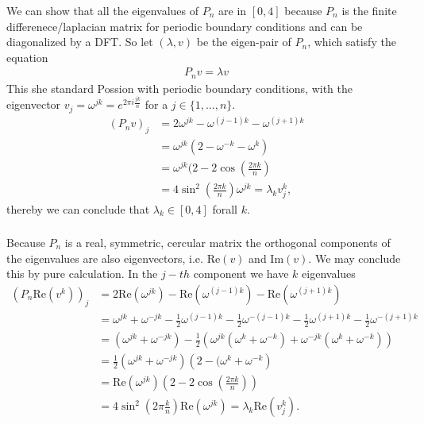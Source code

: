\subsubsection{}
We can show that all the eigenvalues of $P_n$ are in $[0, 4]$ because $P_n$
is the finite differenece/laplacian matrix for periodic boundary conditions
and can be diagonalized by a DFT. So let $\left( \lambda, v \right)$ be the
eigen-pair of $P_n$, which satisfy the equation
\begin{align}
    P_n v = \lambda v
\end{align}
This she standard Possion with periodic boundary conditions, with the
eigenvector $v_j = \omega^{jk} = e^{2\pi i \frac{jk}{n}}$ for a $j \in
\{1,\ldots,n\}$.
\begin{align}
    (P_n v)_j
    &= 2\omega^{jk}- \omega^{(j-1)k} - \omega^{(j+1)k}\\
    &= \omega^{jk}(2 - \omega^{-k} - \omega^{k})\\
    &= \omega^{jk}(2 - 2\cos\left( \frac{2\pi k}{n} \right)\\
    &= 4\sin^2\left( \frac{2\pi k}{n} \right) \omega^{jk} = \lambda_k v^k_j,
\end{align}
thereby we can conclude that $\lambda_k \in [0, 4]$ forall $k$.
\subsubsection{}
Because $P_n$ is a real, symmetric, cercular matrix the orthogonal components
of the eigenvalues are also eigenvectors, i.e. $\text{Re}\left(v \right)$ and
$\text{Im}\left(v \right) $. We may conclude this by pure calculation. In the $j-th$
component we have $k$ eigenvalues
\begin{align}
    \left(P_n\text{Re}\left( v^k \right)\right) _j
    &= 2\text{Re}\left( \omega^{jk} \right) -\text{Re}\left( \omega^{(j-1)k}
    \right) -\text{Re}\left( \omega^{(j+1)k} \right)\\
    &= \omega^{jk} +\omega^{-jk} - \frac{1}{2}\omega^{(j-1)k}
    -\frac{1}{2}\omega^{-(j-1)k}
    -\frac{1}{2}\omega^{(j+1)k} -\frac{1}{2}\omega^{-(j+1)k}\\
    &= \left( \omega^{jk} + \omega^{-jk} \right)
    -\frac{1}{2}\left( \omega^{jk}\left(\omega^{k} + \omega^{-k} \right)
    +\omega^{-jk}\left(\omega^{k} + \omega^{-k} \right)  \right)\\
    &= \frac{1}{2}\left( \omega^{jk} + \omega^{-jk} \right)\left(
    2-(\omega^{k} + \omega^{-k}\right) \\
    &= \text{Re}\left(\omega^{jk}  \right) \left(2-2\cos\left( \frac{2\pi
    k}{n}\right)\right)\\
    &= 4\sin^2\left( 2\pi \frac{k}{n} \right) \text{Re}\left( \omega^{jk}
    \right)  = \lambda_k\text{Re}(v^k_j).
\end{align}
